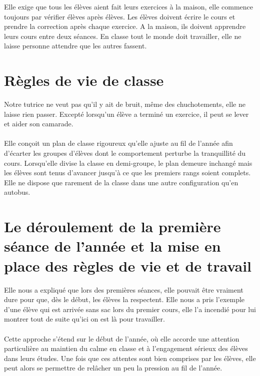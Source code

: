 Elle exige que tous les élèves aient fait leurs exercices à la maison,
elle commence toujours par vérifier élèves après élèves.
Les élèves doivent écrire le cours et prendre la correction après chaque exercice.
A la maison,
ils doivent apprendre leurs cours entre deux séances. En classe tout le monde doit travailler,
elle ne laisse personne attendre que les autres fassent.

\section{Règles de vie de classe}

Notre tutrice ne veut pas qu'il y ait de bruit,
même des chuchotements, elle ne laisse rien passer.
Excepté lorsqu'un élève a terminé un exercice,
il peut se lever et aider son camarade.
\\\\
Elle conçoit un plan de classe rigoureux qu'elle ajuste au fil de l'année afin d'écarter les groupes d'élèves dont le comportement perturbe la tranquillité du cours.
Lorsqu'elle divise la classe en demi-groupe,
le plan demeure inchangé mais les élèves sont tenus d'avancer jusqu'à ce que les premiers rangs soient complets.
Elle ne dispose que rarement de la classe dans une autre configuration qu'en autobus.

\section{Le déroulement de la première séance de l'année et la mise en place des règles de vie et de travail}

Elle nous a expliqué que lors des premières séances, elle pouvait être vraiment
\guillemetleft dure\guillemetright{} pour que,
dès le début,
les élèves la respectent.
Elle nous a pris l'exemple d'une élève qui est arrivée sans sac lors du premier cours,
elle l'a incendié pour lui montrer tout de suite qu'ici on est là pour travailler.
\\\\
Cette approche s'étend sur le début de l'année,
où elle accorde une attention particulière au maintien du calme en classe et à l'engagement sérieux des élèves dans leurs études.
Une fois que ces attentes sont bien comprises par les élèves,
elle peut alors se permettre de relâcher un peu la pression au fil de l'année.
